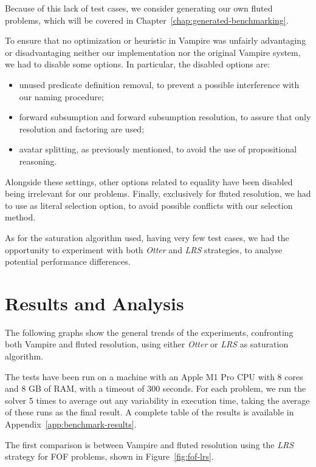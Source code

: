 Because of this lack of test cases, we consider generating our own fluted problems, which will be covered in Chapter~\ref{chap:generated-benchmarking}.

To ensure that no optimization or heuristic in Vampire was unfairly advantaging or disadvantaging neither our implementation nor the original Vampire system, we had to disable some options.
In particular, the disabled options are:
\begin{itemize}
  \item unused predicate definition removal, to prevent a possible interference with our naming procedure;
  \item forward subsumption and forward subsumption resolution, to assure that only resolution and factoring are used;
  \item avatar splitting, as previously mentioned, to avoid the use of propositional reasoning.
\end{itemize}

Alongside these settings, other options related to equality have been disabled being irrelevant for our problems.
Finally, exclusively for fluted resolution, we had to use  as literal selection option, to avoid possible conflicts with our selection method.

As for the saturation algorithm used, having very few test cases, we had the opportunity to experiment with both \emph{Otter} and \emph{LRS} strategies, to analyse potential performance differences.

\section{Results and Analysis}\label{sec:tptp-results-analysis}

The following graphs show the general trends of the experiments, confronting both Vampire and fluted resolution, using either \emph{Otter} or \emph{LRS} as saturation algorithm.

The tests have been run on a machine with an Apple M1 Pro CPU with 8 cores and 8 GB of RAM, with a timeout of 300 seconds. For each problem, we run the solver 5 times to average out any variability in execution time, taking the average of these runs as the final result.
A complete table of the results is available in Appendix~\ref{app:benchmark-results}.

The first comparison is between Vampire and fluted resolution using the \emph{LRS} strategy for FOF problems, shown in Figure~\ref{fig:fof-lrs}.

